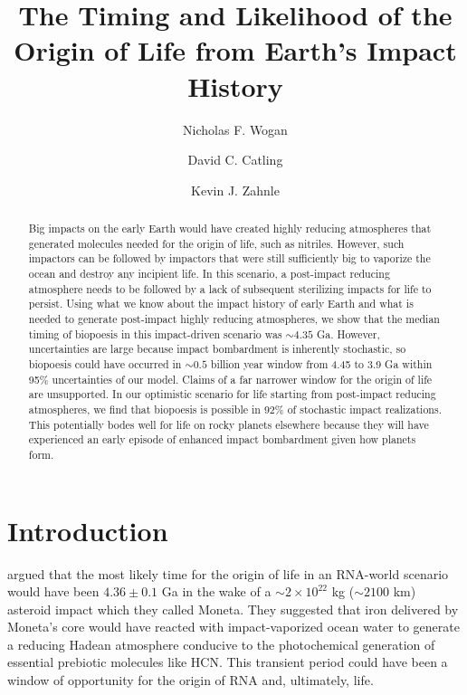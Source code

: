 \documentclass[preprint]{aastex63}
\begin{document}
\title{The Timing and Likelihood of the Origin of Life from Earth's Impact History}

\author{Nicholas F. Wogan}

\author{David C. Catling}

\author{Kevin J. Zahnle}

\begin{abstract}
Big impacts on the early Earth would have created highly reducing atmospheres that generated molecules needed for the origin of life, such as nitriles. However, such impactors can be followed by impactors that were still sufficiently big to vaporize the ocean and destroy any incipient life. In this scenario, a post-impact reducing atmosphere needs to be followed by a lack of subsequent sterilizing impacts for life to persist. Using what we know about the impact history of early Earth and what is needed to generate post-impact highly reducing atmospheres, we show that  the median timing of biopoesis in this impact-driven scenario was $\sim 4.35$ Ga. However, uncertainties are large because impact bombardment is inherently stochastic, so biopoesis could have occurred in $\sim 0.5$ billion year window from 4.45 to 3.9 Ga within 95\% uncertainties of our model. Claims of a far narrower window for the origin of life are unsupported. In our optimistic scenario for life starting from post-impact reducing atmospheres, we find that biopoesis is possible in 92\% of stochastic impact realizations. This potentially bodes well for life on rocky planets elsewhere because they will have experienced an early episode of enhanced impact bombardment given how planets form.
\end{abstract}

\section{Introduction}

\citet{Benner_2020} argued that the most likely time for the origin of life in an RNA-world scenario would have been $4.36 \pm 0.1$ Ga in the wake of a $\sim 2 \times 10^{22}$ kg ($\sim 2100$ km) asteroid impact which they called Moneta. They suggested that iron delivered by Moneta's core would have reacted with impact-vaporized ocean water to generate a reducing Hadean atmosphere conducive to the photochemical generation of essential prebiotic molecules like HCN. This transient period could have been a window of opportunity for the origin of RNA and, ultimately, life.
\end{document}
